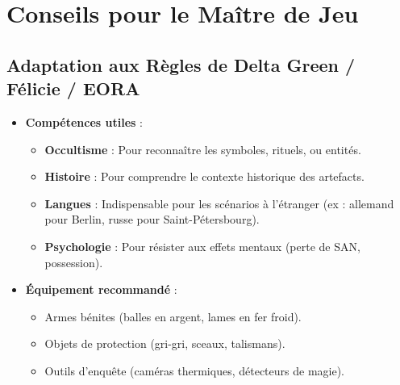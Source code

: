 \documentclass[10pt,a5paper,twoside]{book}
\begin{document}
\newpage

\section{Conseils pour le Maître de Jeu}
\subsection{Adaptation aux Règles de Delta Green / Félicie / EORA}
\begin{itemize}
\item \textbf{Compétences utiles} :
	\begin{itemize}
		\item \textbf{Occultisme} : Pour reconnaître les symboles, rituels, ou entités.
		\item \textbf{Histoire} : Pour comprendre le contexte historique des artefacts.
		\item \textbf{Langues} : Indispensable pour les scénarios à l'étranger (ex : allemand pour Berlin, russe pour Saint-Pétersbourg).
		\item \textbf{Psychologie} : Pour résister aux effets mentaux (perte de SAN, possession).
	\end{itemize}

\item \textbf{Équipement recommandé} :
	\begin{itemize}
		\item Armes bénites (balles en argent, lames en fer froid).
		\item Objets de protection (gri-gri, sceaux, talismans).
		\item Outils d'enquête (caméras thermiques, détecteurs de magie).
	\end{itemize}
\end{itemize}
\end{document}
